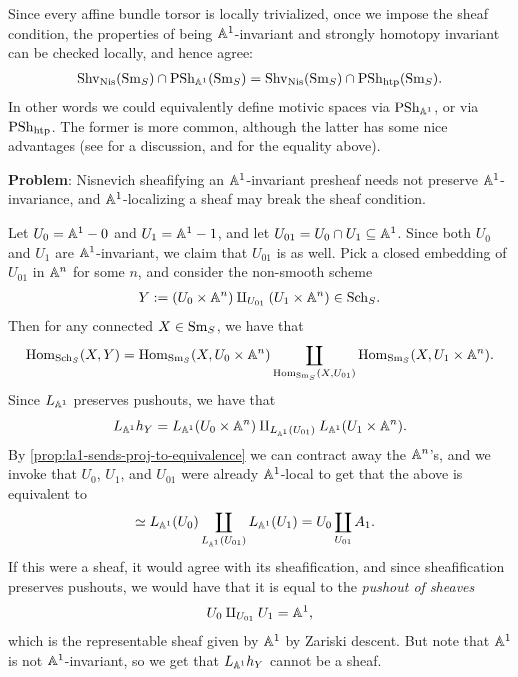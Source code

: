 \documentclass[11pt]{amsart}
\renewcommand{\Pre}{\mathrm{PSh}}
\begin{document}
\begin{remark} Since every affine bundle torsor is locally trivialized, once we impose the sheaf condition, the properties of being $\mathbb{A}^1$-invariant and strongly homotopy invariant can be checked locally, and hence agree:
\begin{align*}
    \mathrm{Shv}_{\mathrm{Nis}}(\mathrm{Sm}_S) \cap \mathrm{PSh}_{\mathbb{A}^1}(\mathrm{Sm}_S) = \mathrm{Shv}_{\mathrm{Nis}}(\mathrm{Sm}_S) \cap \mathrm{PSh}_{\mathrm{htp}}(\mathrm{Sm}_S).
\end{align*}
In other words we could equivalently define motivic spaces via $\Pre_{\A^1}$, or via $\Pre_\htp$. The former is more common, although the latter has some nice advantages (see \cite[p.~204]{Hoyois6} for a discussion, and \cite[3.13]{Hoyois6} for the equality above).
\end{remark}


 
\textbf{Problem}: Nisnevich sheafifying an $\mathbb{A}^1$-invariant presheaf needs not preserve $\mathbb{A}^1$-invariance, and $\mathbb{A}^1$-localizing a sheaf may break the sheaf condition. 

\begin{example} \cite[3.2.7]{MV} Let $U_0 = \mathbb{A}^1-0$ and $U_1 = \mathbb{A}^1-1$, and let $U_{01} = U_0 \cap U_1 \subseteq \mathbb{A}^1$. Since both $U_0$ and $U_1$ are $\mathbb{A}^1$-invariant, we claim that $U_{01}$ is as well. Pick a closed embedding of $U_{01}$ in $\mathbb{A}^n$ for some $n$, and consider the non-smooth scheme
\begin{align*}
    Y:=(U_0 \times \mathbb{A}^n) \amalg_{U_{01}} (U_1 \times \mathbb{A}^n) \in \mathrm{Sch}_S.
\end{align*}
Then for any connected $X\in \mathrm{Sm}_S$, we have that
\begin{align*}
    \mathrm{Hom}_{\mathrm{Sch}_S}(X,Y) = \mathrm{Hom}_{\mathrm{Sm}_S}(X, U_0 \times \mathbb{A}^n) \coprod_{\mathrm{Hom}_{\mathrm{Sm}_S}(X,U_{01})} \mathrm{Hom}_{\mathrm{Sm}_S}(X, U_1 \times \mathbb{A}^n).
\end{align*}
%
Since $L_{\mathbb{A}^1}$ preserves pushouts, we have that
\begin{align*}
    L_{\mathbb{A}^1} h_Y = L_{\mathbb{A}^1}(U_0 \times\mathbb{A}^n) \amalg_{L_{\mathbb{A}^1}(U_{01})} L_{\mathbb{A}^1}(U_1 \times \mathbb{A}^n).
\end{align*}
By \autoref{prop:la1-sends-proj-to-equivalence} we can contract away the $\mathbb{A}^n$'s, and we invoke that $U_0$, $U_1$, and $U_{01}$ were already $\mathbb{A}^1$-local to get that the above is equivalent to
\begin{align*}
    &\simeq L_{\mathbb{A}^1}(U_0) \coprod_{L_{\mathbb{A}^1}(U_{01})} L_{\mathbb{A}^1}(U_1) = U_0 \coprod_{U_{01}} A_1.
\end{align*}
If this were a sheaf, it would agree with its sheafification, and since sheafification preserves pushouts, we would have that it is equal to the \textit{pushout of sheaves}
\begin{align*}
    U_0 \amalg_{U_{01}} U_1 = \mathbb{A}^1,
\end{align*}
which is the representable sheaf given by $\mathbb{A}^1$ by Zariski descent. But note that $\mathbb{A}^1$ is not $\mathbb{A}^1$-invariant, so we get that $L_{\mathbb{A}^1}h_Y$ cannot be a sheaf.
\end{example}
\end{document}
